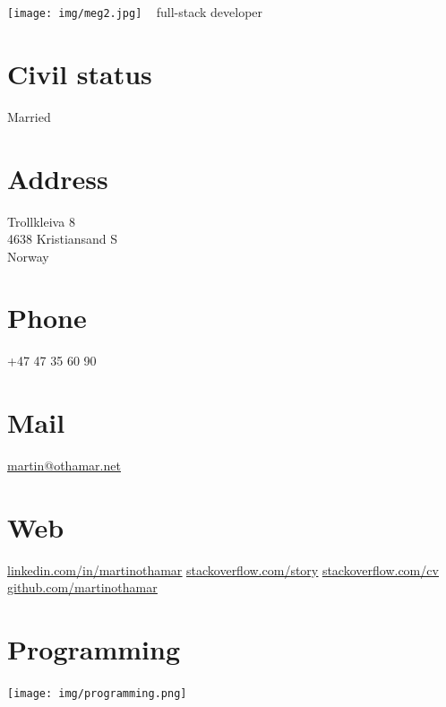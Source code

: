 \documentclass[]{cv-class}
\begin{document}
\vspace{1.15cm}

\begin{aside}
  \texttt{[image: img/meg2.jpg]}
    ~
      {full-stack developer}
   ~
  	  
  \vspace{0.65cm}
  \section{Civil status}
    Married
  	~
  \section{Address}
    Trollkleiva 8\\
    4638 Kristiansand S\\
    Norway
    ~
  \section{Phone}
    +47 47 35 60 90
    ~
  \section{Mail}
    \underline{\href{mailto:martin@othamar.net}{martin@othamar.net}}
    ~
  \section{Web}
	\vspace{0.10cm}
    \underline{\href{https://no.linkedin.com/in/martinothamar}{linkedin.com/in/martinothamar}}
	\vspace{0.10cm}
    \underline{\href{https://stackoverflow.com/story/martinothamar}{stackoverflow.com/story}}
	\vspace{0.10cm}
    \underline{\href{https://stackoverflow.com/cv/martinothamar}{stackoverflow.com/cv}}
	\vspace{0.10cm}
    \underline{\href{https://github.com/martinothamar}{github.com/martinothamar}}
    ~
  \section{Programming}
    \texttt{[image: img/programming.png]}
    ~

\end{aside}
\end{document}
